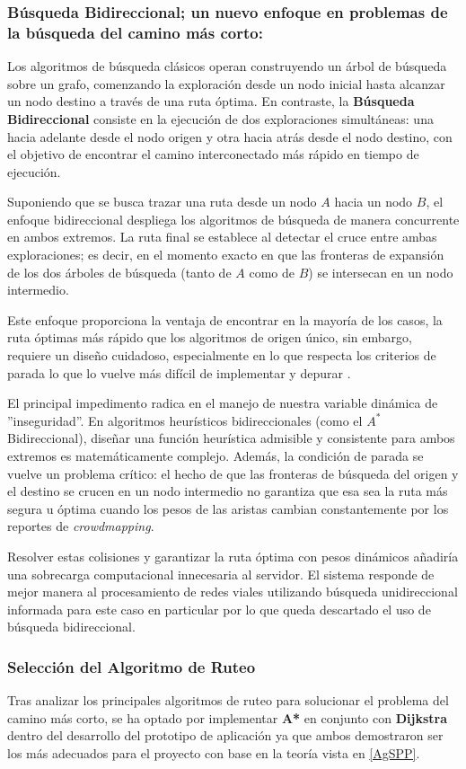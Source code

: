 \subsubsection{Búsqueda Bidireccional; un nuevo enfoque en problemas de la búsqueda del camino más corto:}

Los algoritmos de búsqueda clásicos operan construyendo un árbol de búsqueda sobre un grafo, comenzando la exploración desde un nodo inicial hasta alcanzar un nodo destino a través de una ruta óptima. En contraste, la \textbf{Búsqueda Bidireccional} consiste en la ejecución de dos exploraciones simultáneas: una hacia adelante desde el nodo origen y otra hacia atrás desde el nodo destino, con el objetivo de encontrar el camino interconectado más rápido en tiempo de ejecución.

Suponiendo que se busca trazar una ruta desde un nodo $A$ hacia un nodo $B$, el enfoque bidireccional despliega los algoritmos de búsqueda de manera concurrente en ambos extremos. La ruta final se establece al detectar el cruce entre ambas exploraciones; es decir, en el momento exacto en que las fronteras de expansión de los dos árboles de búsqueda (tanto de $A$ como de $B$) se intersecan en un nodo intermedio.

Este enfoque proporciona la ventaja de encontrar en la mayoría de los casos, la ruta óptimas más rápido que los algoritmos de origen único, sin embargo, requiere un diseño cuidadoso, especialmente en lo que respecta los criterios de parada lo que lo vuelve más difícil de implementar y depurar \cite{baeldung_bidirectional_search}. 
    
El principal impedimento radica en el manejo de nuestra variable dinámica de ''inseguridad''. En algoritmos heurísticos bidireccionales (como el $A^*$ Bidireccional), diseñar una función heurística admisible y consistente para ambos extremos es matemáticamente complejo. Además, la condición de parada se vuelve un problema crítico: el hecho de que las fronteras de búsqueda del origen y el destino se crucen en un nodo intermedio no garantiza que esa sea la ruta más segura u óptima cuando los pesos de las aristas cambian constantemente por los reportes de \textit{crowdmapping}.

Resolver estas colisiones y garantizar la ruta óptima con pesos dinámicos añadiría una sobrecarga computacional innecesaria al servidor. El sistema responde de mejor manera al procesamiento de redes viales utilizando búsqueda unidireccional informada para este caso en particular por lo que queda descartado el uso de búsqueda bidireccional.

\subsubsection{Selección del Algoritmo de Ruteo}

Tras analizar los principales algoritmos de ruteo para solucionar el problema del camino más corto, se ha optado por implementar \textbf{A*} en conjunto con \textbf{Dijkstra} dentro del desarrollo del prototipo de aplicación ya que ambos demostraron ser los más adecuados para el proyecto con base en la teoría vista en \ref{AgSPP}.

